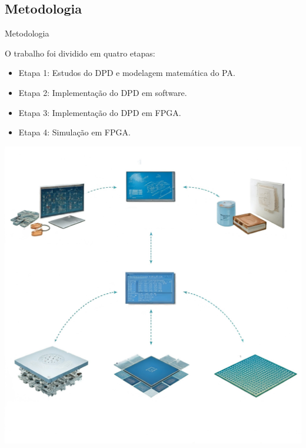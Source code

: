 \documentclass{if-beamer}
\begin{document}
\subsection{Metodologia}
\begin{frame}{Metodologia}
	\begin{minipage}{0.5\textwidth}
		
		
	\end{minipage}%
	\hspace{0.04\textwidth}
	\begin{minipage}{0.5\textwidth}
		 O trabalho foi dividido em quatro etapas:
		\begin{itemize}
			\item Etapa 1: Estudos do DPD e modelagem matemática do PA.
			\item Etapa 2: Implementação do DPD em software.
			\item Etapa 3: Implementação do DPD em FPGA.
			\item Etapa 4: Simulação em FPGA.
		\end{itemize}
	\end{minipage}
	\begin{minipage}{0.5\textwidth}
	
	\includegraphics[scale=0.1]{diagrama.png}
	
	\end{minipage}%
\end{frame}
\end{document}
